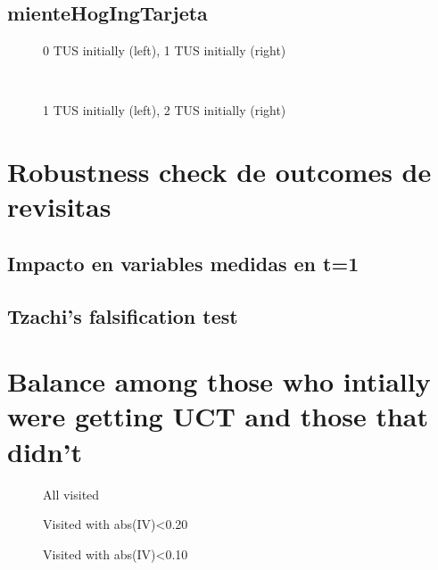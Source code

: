 \documentclass[12pt]{article}
\begin{document}
\subsection{mienteHogIngTarjeta}
\begin{figure}[H]%
	\centering
	\caption*{0 TUS initially (left), 1 TUS initially (right)}
	 \quad 
	 \\
	
	\caption*{1 TUS initially (left), 2 TUS initially (right)}
	 \qquad
	\label{fig:mienteHogIngTarjetaTwo}%
\end{figure}

\section{Robustness check de outcomes de revisitas}

\subsection{Impacto en variables medidas en t=1}

\subsection{Tzachi's falsification test}

\section{Balance among those who intially were getting UCT and those that didn't}

\begin{figure}[H]
	\caption{All visited}
	
	\centering
	\label{fig:balSinConTusPrimVisitaGlob}
\end{figure}

\begin{figure}[H]
	\caption{Visited with abs(IV)<0.20}
	
	\centering
	\label{fig:balSinConTusPrimVisita020}
\end{figure}

\begin{figure}[H]
	\caption{Visited with abs(IV)<0.10}
	
	\centering
	\label{fig:balSinConTusPrimVisita010}
\end{figure}
\end{document}

